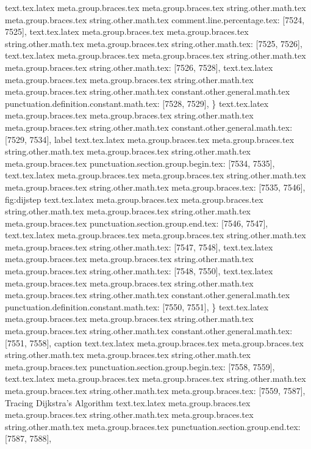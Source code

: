 {{{{{{{{{{{{{{{{{{{{{{{{{{{{{{{{{{{{{{{{{{{{{{{{{{{{{{{{{{{{{{{{{{{{{{{{{{{{{{{{{{{{{{{{{{{{{{{{{{{{{{{{{{{{{{{{{{{{{{{{{{{{{{{{{{{{{{{{{{{{{{{{{{{{{{{{{{{{{{{{{{{{{{{{{{{{{{{{{{{{{{{{{{{{{{{{{{{{{{{{{{{{{text.tex.latex meta.group.braces.tex meta.group.braces.tex string.other.math.tex meta.group.braces.tex string.other.math.tex comment.line.percentage.tex: [7524, 7525], {%
text.tex.latex meta.group.braces.tex meta.group.braces.tex string.other.math.tex meta.group.braces.tex string.other.math.tex: [7525, 7526], {
}
text.tex.latex meta.group.braces.tex meta.group.braces.tex string.other.math.tex meta.group.braces.tex string.other.math.tex: [7526, 7528], {  }
text.tex.latex meta.group.braces.tex meta.group.braces.tex string.other.math.tex meta.group.braces.tex string.other.math.tex constant.other.general.math.tex punctuation.definition.constant.math.tex: [7528, 7529], {\}
text.tex.latex meta.group.braces.tex meta.group.braces.tex string.other.math.tex meta.group.braces.tex string.other.math.tex constant.other.general.math.tex: [7529, 7534], {label}
text.tex.latex meta.group.braces.tex meta.group.braces.tex string.other.math.tex meta.group.braces.tex string.other.math.tex meta.group.braces.tex punctuation.section.group.begin.tex: [7534, 7535], {{}
text.tex.latex meta.group.braces.tex meta.group.braces.tex string.other.math.tex meta.group.braces.tex string.other.math.tex meta.group.braces.tex: [7535, 7546], {fig:dijstep}
text.tex.latex meta.group.braces.tex meta.group.braces.tex string.other.math.tex meta.group.braces.tex string.other.math.tex meta.group.braces.tex punctuation.section.group.end.tex: [7546, 7547], {}}
text.tex.latex meta.group.braces.tex meta.group.braces.tex string.other.math.tex meta.group.braces.tex string.other.math.tex: [7547, 7548], {
}
text.tex.latex meta.group.braces.tex meta.group.braces.tex string.other.math.tex meta.group.braces.tex string.other.math.tex: [7548, 7550], {  }
text.tex.latex meta.group.braces.tex meta.group.braces.tex string.other.math.tex meta.group.braces.tex string.other.math.tex constant.other.general.math.tex punctuation.definition.constant.math.tex: [7550, 7551], {\}
text.tex.latex meta.group.braces.tex meta.group.braces.tex string.other.math.tex meta.group.braces.tex string.other.math.tex constant.other.general.math.tex: [7551, 7558], {caption}
text.tex.latex meta.group.braces.tex meta.group.braces.tex string.other.math.tex meta.group.braces.tex string.other.math.tex meta.group.braces.tex punctuation.section.group.begin.tex: [7558, 7559], {{}
text.tex.latex meta.group.braces.tex meta.group.braces.tex string.other.math.tex meta.group.braces.tex string.other.math.tex meta.group.braces.tex: [7559, 7587], {Tracing Dijkstra's Algorithm}
text.tex.latex meta.group.braces.tex meta.group.braces.tex string.other.math.tex meta.group.braces.tex string.other.math.tex meta.group.braces.tex punctuation.section.group.end.tex: [7587, 7588], {}}
}}}}}}}}}}}}}}}}}}}}}}}}}}}}}}}}}}}}}}}}}}}}}}}}}}}}}}}}}}}}}}}}}}}}}}}}}}}}}}}}}}}}}}}}}}}}}}}}}}}}}}}}}}}}}}}}}}}}}}}}}}}}}}}}}}}}}}}}}}}}}}}}}}}}}}}}}}}}}}}}}}}}}}}}}}}}}}}}}}}}}}}}}}}}}}}}}}}}}}}}}}}}}}}}
